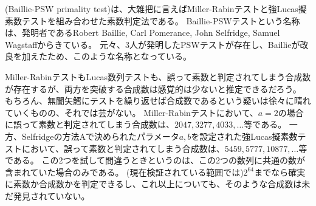 (Baillie-PSW primality test)は、大雑把に言えばMiller-Rabinテストと強Lucas擬素数テストを組み合わせた素数判定法である。
Baillie-PSWテストという名称は、発明者であるRobert Baillie, Carl Pomerance, John Selfridge, Samuel Wagstaffからきている。
元々、3人が発明したPSWテストが存在し、Baillieが改良を加えたため、このような名称となっている。

Miller-RabinテストもLucas数列テストも、誤って素数と判定されてしまう合成数が存在するが、両方を突破する合成数は感覚的は少ないと推定できるだろう。
もちろん、無闇矢鱈にテストを繰り返せば合成数であるという疑いは徐々に晴れていくものの、それでは芸がない。
Miller-Rabinテストにおいて、$a=2$の場合に誤って素数と判定されてしまう合成数は、$2047, 3277, 4033,\ldots$等である。
一方、Selfridgeの方法Aで決められたパラメータ$a,b$を設定された強Lucas擬素数テストにおいて、誤って素数と判定されてしまう合成数は、$5459, 5777, 10877,\ldots$等である。
この2つを試して間違うときというのは、この2つの数列に共通の数が含まれていた場合のみである。
(現在検証されている範囲では)$2^64$までなら確実に素数か合成数かを判定できるし、これ以上についても、そのような合成数は未だ発見されていない。


